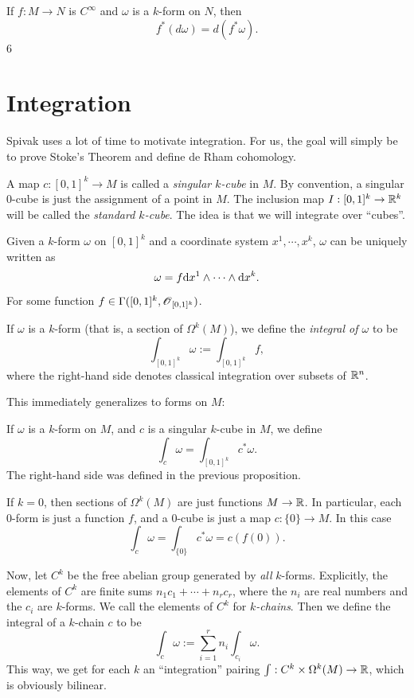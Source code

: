 \documentclass[11pt, english]{article}
\begin{document}
\begin{prop}
If $f:M \to N$ is $C^\infty$ and $\omega$ is a $k$-form on $N$, then 
\[
f^\ast (d \omega) = d(f^\ast \omega).
 \]
6
 \end{prop}

\newpage
\section{Integration}

Spivak uses a lot of time to motivate integration. For us, the goal will simply be to prove Stoke's Theorem and define de Rham cohomology.

A map $c:[0,1]^k \to M$ is called a \emph{singular $k$-cube} in $M$. By convention, a singular $0$-cube is just the assignment of a point in $M$. The inclusion map $I:[0,1]^k \to \mathbb{R}^k$ will be called the \emph{standard $k$-cube}. The idea is that we will integrate over ``cubes''.

Given a $k$-form $\omega$ on $[0,1]^k$ and a coordinate system $x^1,\cdots,x^k$, $\omega$ can be uniquely written as 
\[
 \omega = f \mathrm{d}{x}^1 \wedge \cdots \wedge \mathrm{d}{x}^k.
\]
For some function $f \in \Gamma([0,1]^k, \operatorname{\mathscr{O}}_{[0,1]^k})$. 
\begin{defi}
If $\omega$ is a $k$-form (that is, a section of $\Omega^k(M)$), we define the \emph{integral of $\omega$} to be
\[
\int_{[0,1]^k} \omega := \int_{[0,1]^k} f,
\]
where the right-hand side denotes classical integration over subsets of $\mathbb{R}^n$.
\end{defi}

This immediately generalizes to forms on $M$:
\begin{defi}
  If $\omega$ is a $k$-form on $M$, and $c$ is a singular $k$-cube in $M$, we define
\[
\int_c \omega = \int_{[0,1]^k} c^\ast \omega.
\]
The right-hand side was defined in the previous proposition.
\end{defi}

\begin{remark}
  If $k=0$, then sections of $\Omega^k(M)$ are just functions $M \to \mathbb{R}$. In particular, each $0$-form is just a function $f$, and a $0$-cube is just a map $c:\{ 0 \} \to M$. In this case
\[
\int_c \omega = \int_{\{ 0 \}} c^\ast \omega = c(f(0)).
\]
\end{remark}

Now, let $C^k$ be the free abelian group generated by \emph{all} $k$-forms. Explicitly, the elements of $C^k$ are finite sums $n_1c_1+\cdots+n_rc_r$, where the $n_i$ are real numbers and the $c_i$ are $k$-forms. We call the elements of $C^k$ for \emph{$k$-chains}. Then we define the integral of a $k$-chain $c$ to be
\[
\int_c \omega := \sum_{i=1}^r n_i \int_{c_i} \omega.
\]
This way, we get for each $k$ an ``integration'' pairing $\int:C^k \times \Omega^k(M) \to \mathbb{R}$, which is obviously bilinear.
\end{document}
